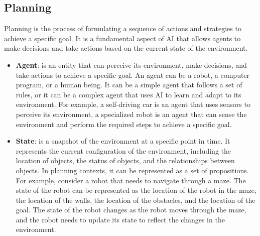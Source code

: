 \subsection{Planning}
Planning is the process of formulating a sequence of actions and strategies to achieve a specific goal.
It is a fundamental aspect of \ac{AI} that allows agents to make decisions and take actions based on the current state of the environment.
\begin{itemize}
  \item \textbf{Agent}: is an entity that can perceive its environment, make decisions, and take actions to achieve a specific goal. An agent can be a robot, a computer program, or a human being. It can be a simple agent that follows a set of rules, or it can be a complex agent that uses \ac{AI} to learn and adapt to its environment. For example, a self-driving car is an agent that uses sensors to perceive its environment, a specialized robot is an agent that can sense the environment and perform the required steps to achieve a specific goal.

  \item \textbf{State}: is a snapshot of the environment at a specific point in time. It represents the current configuration of the environment, including the location of objects, the status of objects, and the relationships between objects. In planning contexts, it can be represented as a set of propositions. For example, consider a robot that needs to navigate through a maze. The state of the robot can be represented as the location of the robot in the maze, the location of the walls, the location of the obstacles, and the location of the goal. The state of the robot changes as the robot moves through the maze, and the robot needs to update its state to reflect the changes in the environment.


\end{itemize}
